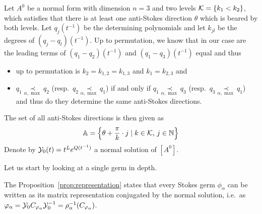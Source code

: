 Let $A^0$ be a normal form with dimension $n=3$ and two levels
$\mathcal{K}=\{k_1<k_2\}$, which satisfies that there is at least one anti-Stokes
direction $\theta$ which is beared by both levels.
Let $q_j(t^{-1})$ be the determining polynomials and let $k_{jl}$ be the
degrees of $(q_j-q_l)(t^{-1})$.
Up to permutation, we know that in our case are the leading terms of
$(q_1-q_2)(t^{-1})$ and $(q_1-q_3)(t^{-1})$ equal and thus
\begin{itemize}
  \item up to permutation is $k_2=k_{1,2}=k_{1,3}$ and $k_1=k_{2,3}$ and
  \item $q_1 \underset{\alpha,\max}{\prec} q_2$
    (resp.~$q_2 \underset{\alpha,\max}{\prec} q_1$)
    if and only if 
    $q_1 \underset{\alpha,\max}{\prec} q_3$
    (resp.~$q_3 \underset{\alpha,\max}{\prec} q_1$)
    and thus do they determine the same anti-Stokes directions.
\end{itemize}
The set of all anti-Stokes directions is then given as
\[
  \mathbb{A}=\left\{\theta+\frac{\pi}{k}\cdot j\mid k\in\mathcal{K}\text{, }j\in\mathbb{N}\right\}
\]
Denote by $\mathcal{Y}_0(t)=t^Le^{Q(t^{-1})}$ a normal solution of $[A^0]$.

Let us start by looking at a single germ in depth.
\begin{comment}
  \rewrite{First} we want to use the Stokes matrices of Stokes germs, discussed
  in Section~\ref{sec:matrixReps}, to \rewrite{obtain some statements} about
  the \rewrite{structure} of the Stokes germs in our situation.
\end{comment}
The Proposition~\ref{prop:representation} states that every Stokes germ
$\phi_\alpha$ can be written as its matrix representation conjugated by the
normal solution, i.e.\ as $\varphi_\alpha=\mathcal{Y}_{0}C_{\varphi_\alpha}\mathcal{Y}_{0}^{-1}
=\rho_{\alpha}^{-1}(C_{\varphi_\alpha})$.

